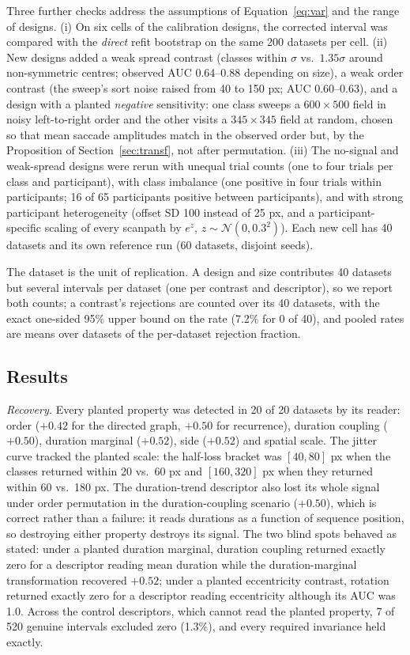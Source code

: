 Three further checks address the assumptions of Equation~\ref{eq:var} and the range of designs. (i) On six cells of the calibration designs, the corrected interval was compared with the \emph{direct} refit bootstrap on the same 200 datasets per cell. (ii) New designs added a weak spread contrast (classes within $\sigma$ vs.\ $1.35\sigma$ around non-symmetric centres; observed AUC 0.64--0.88 depending on size), a weak order contrast (the sweep's sort noise raised from 40 to 150 px; AUC 0.60--0.63), and a design with a planted \emph{negative} sensitivity: one class sweeps a $600\times500$ field in noisy left-to-right order and the other visits a $345\times345$ field at random, chosen so that mean saccade amplitudes match in the observed order but, by the Proposition of Section~\ref{sec:transf}, not after permutation. (iii) The no-signal and weak-spread designs were rerun with unequal trial counts (one to four trials per class and participant), with class imbalance (one positive in four trials within participants; 16 of 65 participants positive between participants), and with strong participant heterogeneity (offset SD 100 instead of 25 px, and a participant-specific scaling of every scanpath by $e^{z}$, $z \sim \mathcal{N}(0, 0.3^2)$). Each new cell has 40 datasets and its own reference run (60 datasets, disjoint seeds).

The dataset is the unit of replication. A design and size contributes 40 datasets but several intervals per dataset (one per contrast and descriptor), so we report both counts; a contrast's rejections are counted over its 40 datasets, with the exact one-sided 95\% upper bound on the rate (7.2\% for 0 of 40), and pooled rates are means over datasets of the per-dataset rejection fraction.

\subsection{Results}
\emph{Recovery.} Every planted property was detected in 20 of 20 datasets by its reader: order ($+0.42$ for the directed graph, $+0.50$ for recurrence), duration coupling ($+0.50$), duration marginal ($+0.52$), side ($+0.52$) and spatial scale. The jitter curve tracked the planted scale: the half-loss bracket was $[40, 80]$ px when the classes returned within 20 vs.\ 60 px and $[160, 320]$ px when they returned within 60 vs.\ 180 px. The duration-trend descriptor also lost its whole signal under order permutation in the duration-coupling scenario ($+0.50$), which is correct rather than a failure: it reads durations as a function of sequence position, so destroying either property destroys its signal. The two blind spots behaved as stated: under a planted duration marginal, duration coupling returned exactly zero for a descriptor reading mean duration while the duration-marginal transformation recovered $+0.52$; under a planted eccentricity contrast, rotation returned exactly zero for a descriptor reading eccentricity although its AUC was 1.0. Across the control descriptors, which cannot read the planted property, 7 of 520 genuine intervals excluded zero (1.3\%), and every required invariance held exactly.

